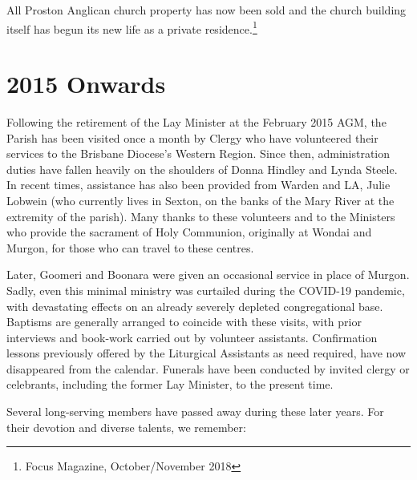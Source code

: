 All Proston Anglican church property has now been sold and the church building itself has begun its new life as a private residence.\footnote{Focus Magazine, October/November 2018}


\section{2015 Onwards}



Following the retirement of the Lay Minister at the February 2015 AGM, the Parish has been visited once a month by Clergy who have volunteered their services to the Brisbane Diocese's Western Region. Since then, administration duties have fallen heavily on the shoulders of Donna Hindley and Lynda Steele. In recent times, assistance has also been provided from Warden and LA, Julie Lobwein (who currently lives in Sexton, on the banks of the Mary River at the extremity of the parish). Many thanks to these volunteers and to the Ministers who provide the sacrament of Holy Communion, originally at Wondai and Murgon, for those who can travel to these centres.



Later, Goomeri and Boonara were given an occasional service in place of Murgon. Sadly, even this minimal ministry was curtailed during the COVID-19 pandemic, with devastating effects on an already severely depleted congregational base. Baptisms are generally arranged to coincide with these visits, with prior interviews and book-work carried out by volunteer assistants. Confirmation lessons previously offered by the Liturgical Assistants as need required, have now disappeared from the calendar. Funerals have been conducted by invited clergy or celebrants, including the former Lay Minister, to the present time.



\newpage


Several long-serving members have passed away during these later years. For their devotion and diverse talents, we remember:



